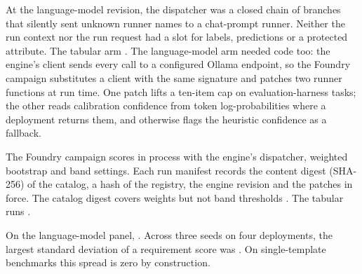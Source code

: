 At the language-model revision, the dispatcher was a closed chain of branches that silently sent unknown runner names to a chat-prompt runner.
Neither the run context nor the run request had a slot for labels, predictions or a protected attribute.
The tabular arm .
The language-model arm needed code too: the engine's client sends every call to a configured Ollama endpoint, so the Foundry campaign substitutes a client with the same signature and patches two runner functions at run time.
One patch lifts a ten-item cap on evaluation-harness tasks; the other reads calibration confidence from token log-probabilities where a deployment returns them, and otherwise flags the heuristic confidence as a fallback.

The Foundry campaign scores in process with the engine's dispatcher, weighted bootstrap and band settings.
Each run manifest records the content digest (SHA-256) of the catalog, a hash of the registry, the engine revision and the patches in force.
The catalog digest covers weights but not band thresholds .
The tabular runs .

On the language-model panel, .
Across three seeds on four deployments, the largest standard deviation of a requirement score was .
On single-template benchmarks this spread is zero by construction.

